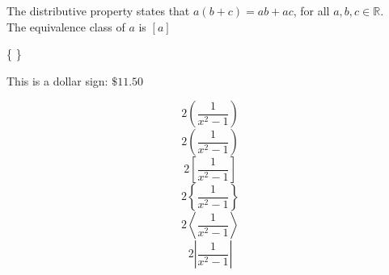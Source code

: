 \documentclass[12pt,a4paper]{article}
\begin{document}
The distributive property states that $a(b+c)=ab+ac$, for all $a, b, c \in \mathbb{R}$. \\[12pt]
The equivalence class of $a$ is $[a]$

\{ \}

This is a dollar sign: $\$11.50$

$$2(\frac{1}{x^2-1})$$
$$2\left(\frac{1}{x^2-1}\right)$$
$$2\left[\frac{1}{x^2-1}\right]$$
$$2\left\{\frac{1}{x^2-1}\right\}$$
$$2\left\langle\frac{1}{x^2-1}\right\rangle$$
$$2\left|\frac{1}{x^2-1}\right|$$
\end{document}
